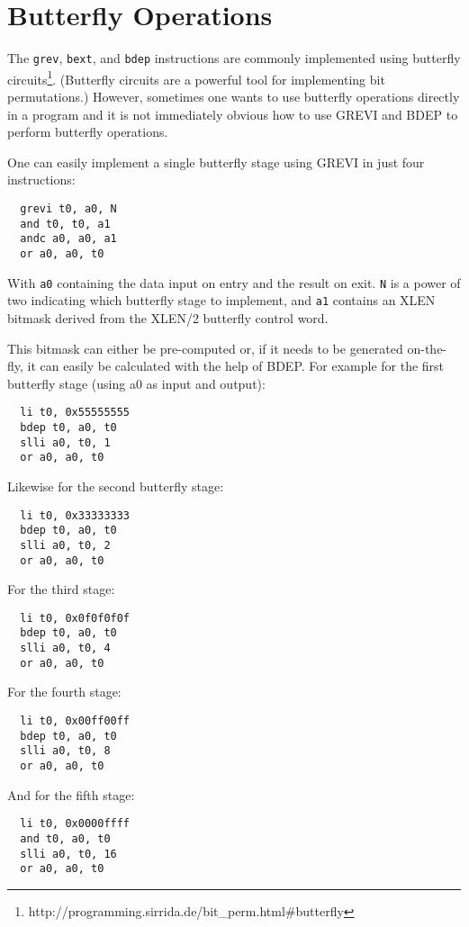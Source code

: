 \section{Butterfly Operations}

The \texttt{grev}, \texttt{bext}, and \texttt{bdep} instructions are commonly
implemented using butterfly circuits\footnote{http://programming.sirrida.de/bit\_perm.html\#butterfly}.
(Butterfly circuits are a powerful tool for implementing bit permutations.)
However, sometimes one wants to use butterfly operations directly in a program
and it is not immediately obvious how to use GREVI and BDEP to perform
butterfly operations.

One can easily implement a single butterfly stage using GREVI in just four
instructions:

\begin{verbatim}
  grevi t0, a0, N
  and t0, t0, a1
  andc a0, a0, a1
  or a0, a0, t0
\end{verbatim}

With {\tt a0} containing the data input on entry and the result on exit. {\tt N} is a
power of two indicating which butterfly stage to implement, and {\tt a1} contains
an XLEN bitmask derived from the XLEN/2 butterfly control word.

This bitmask can either be pre-computed or, if it needs to be generated
on-the-fly, it can easily be calculated with the help of BDEP. For example
for the first butterfly stage (using a0 as input and output):

\begin{verbatim}
  li t0, 0x55555555
  bdep t0, a0, t0
  slli a0, t0, 1
  or a0, a0, t0
\end{verbatim}

Likewise for the second butterfly stage:

\begin{verbatim}
  li t0, 0x33333333
  bdep t0, a0, t0
  slli a0, t0, 2
  or a0, a0, t0
\end{verbatim}

For the third stage:

\begin{verbatim}
  li t0, 0x0f0f0f0f
  bdep t0, a0, t0
  slli a0, t0, 4
  or a0, a0, t0
\end{verbatim}

For the fourth stage:

\begin{verbatim}
  li t0, 0x00ff00ff
  bdep t0, a0, t0
  slli a0, t0, 8
  or a0, a0, t0
\end{verbatim}

And for the fifth stage:

\begin{verbatim}
  li t0, 0x0000ffff
  and t0, a0, t0
  slli a0, t0, 16
  or a0, a0, t0
\end{verbatim}
